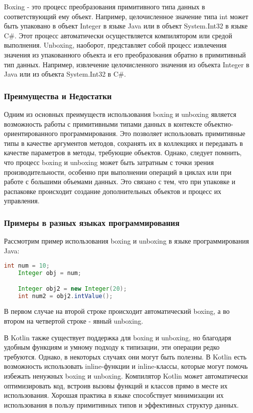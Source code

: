 Boxing - это процесс преобразования примитивного типа данных в соответствующий ему объект.
Например, целочисленное значение типа int может быть упаковано в объект Integer в языке Java или в объект
System.Int32 в языке C\#.
Этот процесс автоматически осуществляется компилятором или средой выполнения.
Unboxing, наоборот, представляет собой процесс извлечения значения из упакованного объекта и его преобразования
обратно в примитивный тип данных.
Например, извлечение целочисленного значения из объекта Integer в Java или из объекта System.Int32 в C\#.

\subsubsection{Преимущества и Недостатки}

Одним из основных преимуществ использования boxing и unboxing является возможность работы с примитивными типами данных
в контексте объектно-ориентированного программирования.
Это позволяет использовать примитивные типы в качестве аргументов методов, сохранять их в коллекциях и передавать в
качестве параметров в методы, требующие объектов.
Однако, следует помнить, что процесс boxing и unboxing может быть затратным с точки зрения производительности, особенно
при выполнении операций в циклах или при работе с большими объемами данных.
Это связано с тем, что при упаковке и распаковке происходит создание дополнительных объектов и процесс их управления.

\subsubsection{Примеры в разных языках программирования}

Рассмотрим пример использования boxing и unboxing в языке программирования Java:
\begin{lstlisting}[language=Java,label={lst:lstlisting22}]
    int num = 10;
    Integer obj = num;

    Integer obj2 = new Integer(20);
    int num2 = obj2.intValue();
\end{lstlisting}
В первом случае на второй строке происходит автоматический boxing, а во втором на четвертой строке - явный unboxing.

В Kotlin также существует поддержка для boxing и unboxing, но благодаря удобным функциям и умному подходу к типизации,
эти операции редко требуются.
Однако, в некоторых случаях они могут быть полезны.
В Kotlin есть возможность использовать inline-функции и inline-классы, которые могут помочь избежать ненужных boxing и
unboxing.
Компилятор Kotlin может автоматически оптимизировать код, встроив вызовы функций и классов прямо в месте их использования.
Хорошая практика в языке способствует минимизации их использования в пользу примитивных типов и эффективных структур данных.

